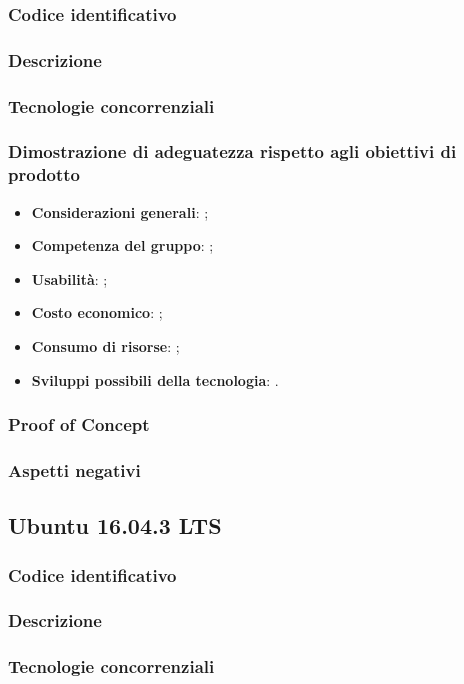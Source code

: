 \documentclass[./../Technology Baseline.tex]{subfiles}
\begin{document}
\subsubsection{Codice identificativo}
\subsubsection{Descrizione}
\subsubsection{Tecnologie concorrenziali}
\subsubsection{Dimostrazione di adeguatezza rispetto agli obiettivi di prodotto}
\begin{itemize}
	\item \textbf{Considerazioni generali}: ;
	\item \textbf{Competenza del gruppo}: ;
	\item \textbf{Usabilità}: ;
	\item \textbf{Costo economico}: ;
	\item \textbf{Consumo di risorse}: ;
	\item \textbf{Sviluppi possibili della tecnologia}: .
\end{itemize}
\subsubsection{Proof of Concept}
\subsubsection{Aspetti negativi}

\subsection{Ubuntu 16.04.3 LTS}

\subsubsection{Codice identificativo}
\subsubsection{Descrizione}
\subsubsection{Tecnologie concorrenziali}
\end{document}
